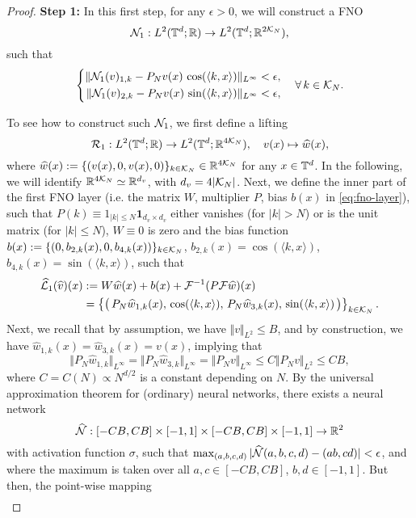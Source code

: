 \documentclass[reqno,a4paper]{amsart}
\begin{document}
\begin{proof}
\textbf{Step 1:}
In this first step, for any $\epsilon > 0$, we will construct a FNO
\[
\mathcal{N}_1: L^2(\mathbb{T}^d; \mathbb{R}) \to L^2(\mathbb{T}^d; \mathbb{R}^{2\mathcal{K}_N}),
\]
such that 
\begin{align} \label{eq:N1}
\left\{
\begin{aligned}
\Vert \mathcal{N}_1(v)_{1,k} - P_Nv(x)\, \cos(\langle k, x\rangle) \Vert_{L^\infty} < \epsilon, \\
\Vert \mathcal{N}_1(v)_{2,k} - P_Nv(x)\, \sin(\langle k,x\rangle) \Vert_{L^\infty} < \epsilon,
\end{aligned}
\right.
\quad \forall \, {k\in\mathcal{K}_N}.
\end{align}

To see how to construct such $\mathcal{N}_1$, we first define a lifting 
\[
\mathcal{R}_1: L^2(\mathbb{T}^d;\mathbb{R}) \to L^2(\mathbb{T}^d;\mathbb{R}^{4\mathcal{K}_N}), \quad
v(x) \mapsto \widehat{w}(x),
\]
where $\widehat{w}(x) := \{ (v(x), 0, v(x), 0) \}_{k\in \mathcal{K}_N} \in \mathbb{R}^{4\mathcal{K}_N}$ for any $x\in \mathbb{T}^d$. In the following, we will identify $\mathbb{R}^{4\mathcal{K}_N}\simeq \mathbb{R}^{d_v}$, with $d_v = 4|\mathcal{K}_N|$. Next, we define the inner part of the first FNO layer (i.e. the matrix $W$, multiplier $P$, bias $b(x)$ in \eqref{eq:fno-layer}), such that $P(k) \equiv 1_{|k|\le N} \bm{1}_{d_v\times d_v}$ either vanishes (for $|k|>N$) or is the unit matrix (for $|k|\le N$), $W \equiv 0$ is zero and the bias function $b(x) := \{(0,b_{2,k}(x),0,b_{4,k}(x))\}_{k\in \mathcal{K}_N}$, $b_{2,k}(x) = \cos(\langle k, x\rangle)$, $b_{4,k}(x) = \sin(\langle k, x\rangle)$, such that
\begin{align*}
\widehat{\mathcal{L}}_1(\widehat{v})(x)
&:=
W \widehat{w}(x) + b(x) + \mathcal{F}^{-1} (P \mathcal{F} \widehat{w})(x)
\\
&=
\begin{Bmatrix}
\big(\,
P_N\widehat{w}_{1,k}(x),\,
\cos(\langle k, x\rangle),\,
P_N\widehat{w}_{3,k}(x),\,
\sin(\langle k, x\rangle)
\,\big)
\end{Bmatrix}_{k\in \mathcal{K}_N}.
\end{align*}
Next, we recall that by assumption, we have $\Vert v \Vert_{L^2} \le B$, and by construction, we have $\hat{w}_{1,k}(x) = \hat{w}_{3,k}(x) = v(x)$, implying that \[
\Vert P_N \hat{w}_{1,k} \Vert_{L^\infty}
=
\Vert P_N \hat{w}_{3,k} \Vert_{L^\infty}
=
\Vert P_N v \Vert_{L^\infty}
\le
C \Vert P_N v \Vert_{L^2}
\le
C B,
\]
where $C = C(N) \propto N^{d/2}$ is a constant depending on $N$. By the universal approximation theorem for (ordinary) neural networks, there exists a neural network 
\[
\widehat{\mathcal{N}}: [-CB,CB]\times [-1,1]\times [-CB,CB]\times [-1,1] \to \mathbb{R}^2
\]
with activation function $\sigma$, such that $\max_{(a,b,c,d)} |\widehat{\mathcal{N}}(a,b,c,d) - (ab,cd)| < \epsilon$, and where the maximum is taken over all $a,c \in [-CB,CB]$, $b,d\in [-1,1]$. But then, the point-wise mapping \begin{align*}

\end{align*}
\end{proof}
\end{document}
